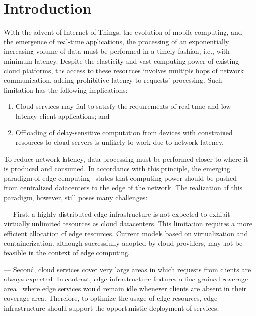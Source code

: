 \section{Introduction}

With the advent of Internet of Things, the evolution of mobile computing, and the emergence of real-time applications, the processing of an exponentially increasing volume of data must be performed in a timely fashion, i.e., with minimum latency. Despite the elasticity and vast computing power of existing cloud platforms, the access to these resources involves multiple hops of network communication, adding prohibitive latency to requests' processing. Such limitation has the following implications:

\begin{enumerate}

\item Cloud services may fail to satisfy the requirements of real-time and low-latency client applications; and

\item Offloading of delay-sensitive computation from devices with constrained resources to cloud servers is unlikely to work due to network-latency.

\end{enumerate}


To reduce network latency, data processing must be performed closer to where it is produced and consumed. In accordance with this principle, the emerging paradigm of edge computing~\cite{} states that computing power should be pushed from centralized datacenters to the edge of the network. The realization of this paradigm, however, still poses many challenges:

%
--- First, a highly distributed edge infrastructure is not expected to exhibit virtually unlimited resources as cloud datacenters. This limitation requires a more efficient allocation of edge resources. Current models based on virtualization and containerization, although successfully adopted by cloud providers, may not be feasible in the context of edge computing.

--- Second, cloud services cover very large areas in which requests from clients are always expected. In contrast, edge infrastructure features a fine-grained coverage area~\cite{Dehos14millimeter5g} where edge services would remain idle whenever clients are absent in their coverage area. Therefore, to optimize the usage of edge resources, edge infrastructure should support the opportunistic deployment of services.

